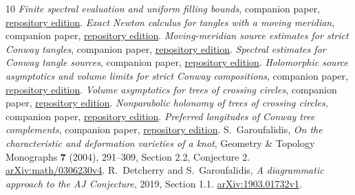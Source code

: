 \begin{thebibliography}{10}
\emph{Finite spectral evaluation and uniform filling bounds}, companion paper,
\href{https://sashakolpakov.github.io/murakamis_dream/papers/filling-bounds.pdf}{repository edition}.
\emph{Exact Newton calculus for tangles with a moving meridian}, companion paper,
\href{https://sashakolpakov.github.io/murakamis_dream/papers/meridian-tangles.pdf}{repository edition}.
\emph{Moving-meridian source estimates for strict Conway tangles}, companion paper,
\href{https://sashakolpakov.github.io/murakamis_dream/papers/moving-meridian-sources.pdf}{repository edition}.
\emph{Spectral estimates for Conway tangle sources}, companion paper,
\href{https://sashakolpakov.github.io/murakamis_dream/papers/conway-source-bounds.pdf}{repository edition}.
\emph{Holomorphic source asymptotics and volume limits for strict Conway compositions}, companion paper,
\href{https://sashakolpakov.github.io/murakamis_dream/papers/conway-asymptotics.pdf}{repository edition}.
\emph{Volume asymptotics for trees of crossing circles}, companion paper,
\href{https://sashakolpakov.github.io/murakamis_dream/papers/circle-tree-volume.pdf}{repository edition}.
\emph{Nonparabolic holonomy of trees of crossing circles}, companion paper,
\href{https://sashakolpakov.github.io/murakamis_dream/papers/nonparabolic-tree-geometry.pdf}{repository edition}.
\emph{Preferred longitudes of Conway tree complements}, companion paper,
\href{https://sashakolpakov.github.io/murakamis_dream/papers/preferred-longitudes.pdf}{repository edition}.
 S.~Garoufalidis, \emph{On the characteristic and deformation
varieties of a knot}, Geometry \& Topology Monographs \textbf{7} (2004),
291--309, Section 2.2, Conjecture 2.
\href{https://arxiv.org/abs/math/0306230v4}{arXiv:math/0306230v4}.
 R.~Detcherry and S.~Garoufalidis,
\emph{A diagrammatic approach to the AJ Conjecture}, 2019,
Section 1.1. \href{https://arxiv.org/abs/1903.01732v1}{arXiv:1903.01732v1}.
\end{thebibliography}
